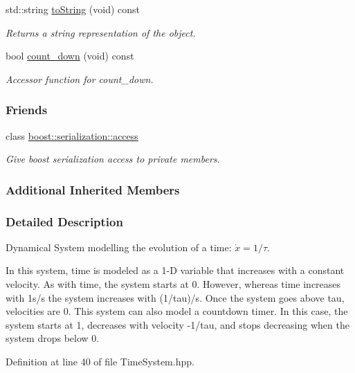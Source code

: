 \begin{DoxyCompactItemize}
std\+::string \hyperlink{classDmpBbo_1_1TimeSystem_a1aca816b42cf0d36118be0ab91120d77}{to\+String} (void) const 
\begin{DoxyCompactList}\small\item\em Returns a string representation of the object. \end{DoxyCompactList}\item 
bool \hyperlink{classDmpBbo_1_1TimeSystem_acb6f561fe702566189e7b5ef7f2d9bca}{count\+\_\+down} (void) const 
\begin{DoxyCompactList}\small\item\em Accessor function for count\+\_\+down. \end{DoxyCompactList}\end{DoxyCompactItemize}
\subsubsection*{Friends}
\begin{DoxyCompactItemize}
\item 
class \hyperlink{classDmpBbo_1_1TimeSystem_ac98d07dd8f7b70e16ccb9a01abf56b9c}{boost\+::serialization\+::access}
\begin{DoxyCompactList}\small\item\em Give boost serialization access to private members. \end{DoxyCompactList}\end{DoxyCompactItemize}
\subsubsection*{Additional Inherited Members}


\subsubsection{Detailed Description}
Dynamical System modelling the evolution of a time\+: $\dot{x} = 1/\tau$. 

In this system, time is modeled as a 1-\/\+D variable that increases with a constant velocity. As with time, the system starts at 0. However, whereas time increases with 1s/s the system increases with (1/tau)/s. Once the system goes above tau, velocities are 0. This system can also model a countdown timer. In this case, the system starts at 1, decreases with velocity -\/1/tau, and stops decreasing when the system drops below 0. 

Definition at line 40 of file Time\+System.\+hpp.



